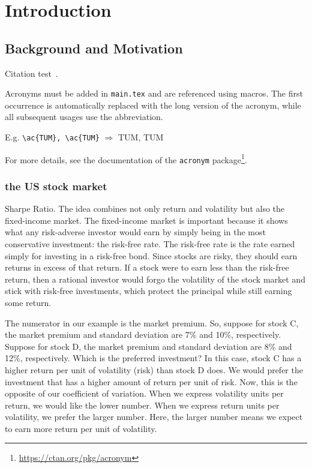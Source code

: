 
\chapter{Introduction}\label{chapter:introduction}

\section{Background and Motivation}
Citation test~\parencite{latex}.

Acronyms must be added in \texttt{main.tex} and are referenced using macros. The first occurrence is automatically replaced with the long version of the acronym, while all subsequent usages use the abbreviation.

E.g. \texttt{\textbackslash ac\{TUM\}, \textbackslash ac\{TUM\}} $\Rightarrow$ \ac{TUM}, \ac{TUM}

For more details, see the documentation of the \texttt{acronym} package\footnote{\url{https://ctan.org/pkg/acronym}}.

\subsection{the US stock market}
Sharpe Ratio.
The idea combines not only return and volatility but also the fixed-income market. The fixed-income market is important because it shows what any risk-adverse investor would earn by simply being in the most conservative investment: the risk-free rate. The risk-free rate is the rate earned simply for investing in a risk-free bond. Since stocks are risky, they should earn returns in excess of that return. If a stock were to earn less than the risk-free return, then a rational investor would forgo the volatility of the stock market and stick with risk-free investments, which protect the principal while still earning some return.

The numerator in our example is the market premium. So, suppose for stock C, the market premium and standard deviation are 7\% and 10\%, respectively. Suppose for stock D, the market premium and standard deviation are 8\% and 12\%, respectively. Which is the preferred investment?
In this case, stock C has a higher return per unit of volatility (risk) than stock D does. We would prefer the investment that has a higher amount of return per unit of risk. Now, this is the opposite of our coefficient of variation. When we express volatility units per return, we would like the lower number. When we express return units per volatility, we prefer the larger number. Here, the larger number means we expect to earn more return per unit of volatility.

